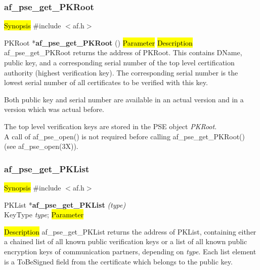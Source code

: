 \subsubsection{af\_pse\_get\_PKRoot}
\label{af_get_PKRoot}
\hl{Synopsis}
\#include $<$af.h$>$

PKRoot *{\bf af\_pse\_get\_PKRoot} ()
\hl{Parameter}
\hl{Description}
af\_pse\_get\_PKRoot returns the address of PKRoot. This contains DName, public key, and a corresponding
serial number of the top level certification authority (highest verification key).
The corresponding serial number is the lowest serial number of all certificates to be 
verified with this key.

Both public key and serial number are available in an actual version and in a version which was
actual before.

The top level verification keys are stored in the PSE object
{\em PKRoot}.
\\ [1em]
A call of af\_pse\_open() is not required before calling af\_pse\_get\_PKRoot()
(see af\_pse\_open(3X)).


\subsubsection{af\_pse\_get\_PKList}
\label{af_get_PKList}
\hl{Synopsis}
\#include $<$af.h$>$

PKList *{\bf af\_pse\_get\_PKList} {\em (type)} \\
KeyType {\em type};
\hl{Parameter}

\hl{Description}
af\_pse\_get\_PKList returns the address of PKList, containing either a chained list of all known
public verification keys or a list of all known public encryption keys of communication partners,
depending on {\em type}.
Each list element is a ToBeSigned field from the certificate which belongs to the public key.
 
